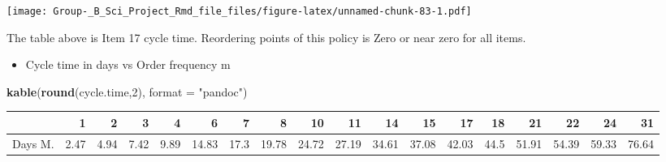 \documentclass[
]{article}
\newenvironment{Shaded}{\begin{snugshade}}{\end{snugshade}}
\newcommand{\DataTypeTok}[1]{\textcolor[rgb]{0.13,0.29,0.53}{#1}}
\newcommand{\DecValTok}[1]{\textcolor[rgb]{0.00,0.00,0.81}{#1}}
\newcommand{\FloatTok}[1]{\textcolor[rgb]{0.00,0.00,0.81}{#1}}
\newcommand{\KeywordTok}[1]{\textcolor[rgb]{0.13,0.29,0.53}{\textbf{#1}}}
\newcommand{\NormalTok}[1]{#1}
\newcommand{\OperatorTok}[1]{\textcolor[rgb]{0.81,0.36,0.00}{\textbf{#1}}}
\newcommand{\OtherTok}[1]{\textcolor[rgb]{0.56,0.35,0.01}{#1}}
\newcommand{\StringTok}[1]{\textcolor[rgb]{0.31,0.60,0.02}{#1}}
\providecommand{\tightlist}{%
  \setlength{\itemsep}{0pt}\setlength{\parskip}{0pt}}
\begin{document}
\begin{Shaded}
\end{Shaded}

\texttt{[image: Group-\_B\_Sci\_Project\_Rmd\_file\_files/figure-latex/unnamed-chunk-83-1.pdf]}

The table above is Item 17 cycle time. Reordering points of this policy
is Zero or near zero for all items.

\begin{itemize}
\tightlist
\item
  Cycle time in days vs Order frequency m
\end{itemize}

\begin{Shaded}
\begin{Highlighting}[]
\KeywordTok{kable}\NormalTok{(}\KeywordTok{round}\NormalTok{(cycle.time,}\DecValTok{2}\NormalTok{), }\DataTypeTok{format =} \StringTok{"pandoc"}\NormalTok{)}
\end{Highlighting}
\end{Shaded}

\begin{longtable}[]{@{}lrrrrrrrrrrrrrrrrr@{}}
\toprule
& 1 & 2 & 3 & 4 & 6 & 7 & 8 & 10 & 11 & 14 & 15 & 17 & 18 & 21 & 22 & 24
& 31\tabularnewline
\midrule
\endhead
Days M. & 2.47 & 4.94 & 7.42 & 9.89 & 14.83 & 17.3 & 19.78 & 24.72 &
27.19 & 34.61 & 37.08 & 42.03 & 44.5 & 51.91 & 54.39 & 59.33 &
76.64\tabularnewline
\bottomrule
\end{longtable}
\end{document}
